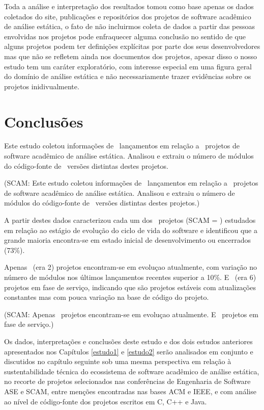 Toda a análise e interpretação dos resultados tomou como base apenas os dados
coletados do site, publicações e repositórios dos projetos de software
acadêmico de análise estática, o fato de não incluirmos coleta de dados a
partir das pessoas envolvidas nos projetos pode enfraquecer alguma conclusão no
sentido de que alguns projetos podem ter definições explícitas por parte dos
seus desenvolvedores mas que não se refletem ainda nos documentos dos projetos,
apesar disso o nosso estudo tem um caráter exploratório, com interesse especial em
uma figura geral do domínio de análise estática e não necessariamente trazer
evidências sobre os projetos inidivualmente.


\section{Conclusões} \label{estudo3:conclusoes} %

Este estudo coletou informações de \ReleasesCount \ lançamentos em relação a
\ProjectsWithReleasesCount \ projetos de software acadêmico de análise
estática. Analisou e extraiu o número de módulos do código-fonte de
\ReleasesMetricsCount \ versões distintas destes projetos.

(SCAM: Este estudo coletou informações de \ReleasesSCAMCount \ lançamentos em relação a
\ProjectsWithReleasesSCAMCount \ projetos de software acadêmico de análise
estática. Analisou e extraiu o número de módulos do código-fonte de
\ReleasesMetricsSCAMCount \ versões distintas destes projetos.)

A partir destes dados caracterizou cada um dos \SoftwareCount \ projetos (SCAM = \SoftwareSCAMCount )
estudados em relação ao estágio de evolução do ciclo de vida do software e
identificou que a grande maioria encontra-se em estado inicial de
desenvolvimento ou encerrados (73\%).

Apenas \EvolutionCount \ (era 2) projetos encontram-se em evoluçao atualmente, com variação no número
de módulos nos últimos lançamentos recentes superior a 10\%. E \ServicingCount \ (era 6) projetos em
fase de serviço, indicando que são projetos estáveis com atualizações
constantes mas com pouca variação na base de código do projeto.

(SCAM: Apenas \EvolutionSCAMCount \ projetos encontram-se em evoluçao atualmente.
E \ServicingSCAMCount \ projetos em fase de serviço.)

Os dados, interpretações e conclusões deste estudo e dos dois estudos
anteriores apresentados nos Capítulos \ref{estudo1} e \ref{estudo2} serão
analisados em conjunto e discutidos no capítulo seguinte sob uma mesma
perspectiva em relação à sustentabilidade técnica do ecossistema de software
acadêmico de análise estática, no recorte de projetos selecionados nas
conferências de Engenharia de Software ASE e SCAM, entre menções encontradas
nas bases ACM e IEEE, e com análise ao nível de código-fonte dos projetos
escritos em C, C++ e Java.

